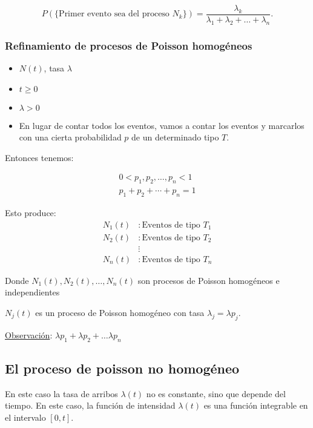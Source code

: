 \documentclass[11pt, a4paper]{article}
\theoremstyle{definition}
\begin{document}
\[
P(\{\text{Primer evento sea del proceso }N_k \}) = \frac{\lambda_k}{\lambda_1 + \lambda_2 + \ldots + \lambda_n}.\]
\subsubsection{Refinamiento de procesos de Poisson homogéneos}

\begin{itemize}
    \item $N(t)$, tasa $\lambda$
    \item $t \geq 0$
    \item $\lambda > 0$
    \item En lugar de contar todos los eventos, vamos a contar los eventos y marcarlos con una cierta probabilidad $p$ de un determinado tipo $T$.
\end{itemize}

Entonces tenemos:

\[
\begin{aligned}
0 < p_1, p_2, \ldots, p_n < 1 \\
p_1 + p_2 + \cdots + p_n = 1
\end{aligned}
\]

Esto produce:
\[
\begin{aligned}
N_1(t) &: \text{Eventos de tipo } T_1 \\
N_2(t) &: \text{Eventos de tipo } T_2 \\
&\vdots \\
N_n(t) &: \text{Eventos de tipo } T_n
\end{aligned}
\]

Donde $N_1(t), N_2(t), \ldots, N_n(t)$ son procesos de Poisson homogéneos e independientes


\begin{center}
    $N_j(t)$ es un proceso de Poisson homogéneo con tasa $\lambda_j = \lambda p_j$. \\
\end{center}


\underline{Observación}: $\lambda p_1 + \lambda p_2 + \ldots \lambda p_n$


\subsection{El proceso de poisson no homogéneo}

En este caso la tasa de arribos $\lambda(t)$ no es constante, sino que depende del tiempo. En este caso, la función de intensidad $\lambda(t)$ es una función integrable en el intervalo $[0,t]$.
\\
\end{document}
